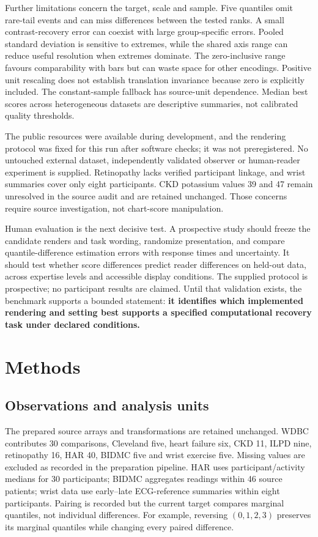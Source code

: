 \documentclass[11pt]{article}
\begin{document}
Further limitations concern the target, scale and sample. Five quantiles omit rare-tail events and can miss differences between the tested ranks. A small contrast-recovery error can coexist with large group-specific errors. Pooled standard deviation is sensitive to extremes, while the shared axis range can reduce useful resolution when extremes dominate. The zero-inclusive range favours comparability with bars but can waste space for other encodings. Positive unit rescaling does not establish translation invariance because zero is explicitly included. The constant-sample fallback has source-unit dependence. Median best scores across heterogeneous datasets are descriptive summaries, not calibrated quality thresholds.

The public resources were available during development, and the rendering protocol was fixed for this run after software checks; it was not preregistered. No untouched external dataset, independently validated observer or human-reader experiment is supplied. Retinopathy lacks verified participant linkage, and wrist summaries cover only eight participants. CKD potassium values 39 and 47 remain unresolved in the source audit and are retained unchanged. Those concerns require source investigation, not chart-score manipulation.

Human evaluation is the next decisive test. A prospective study should freeze the candidate renders and task wording, randomize presentation, and compare quantile-difference estimation errors with response times and uncertainty. It should test whether score differences predict reader differences on held-out data, across expertise levels and accessible display conditions. The supplied protocol is prospective; no participant results are claimed. Until that validation exists, the benchmark supports a bounded statement: \textbf{it identifies which implemented rendering and setting best supports a specified computational recovery task under declared conditions.}

\section*{Methods}
\subsection*{Observations and analysis units}
The prepared source arrays and transformations are retained unchanged. WDBC contributes 30 comparisons, Cleveland five, heart failure six, CKD 11, ILPD nine, retinopathy 16, HAR 40, BIDMC five and wrist exercise five. Missing values are excluded as recorded in the preparation pipeline. HAR uses participant/activity medians for 30 participants; BIDMC aggregates readings within 46 source patients; wrist data use early--late ECG-reference summaries within eight participants.\cite{pimentel2017,jarchi2017} Pairing is recorded but the current target compares marginal quantiles, not individual differences. For example, reversing $(0,1,2,3)$ preserves its marginal quantiles while changing every paired difference.
\end{document}
